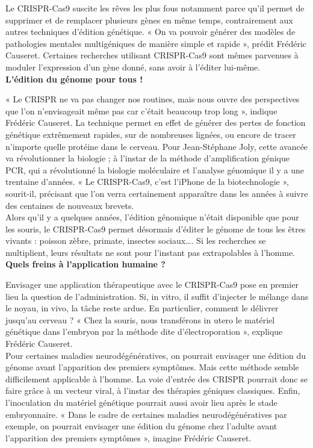 \documentclass[8pt]{article}
\begin{document}
Le CRISPR-Cas9 suscite les rêves les plus fous notamment parce qu’il permet de supprimer et de remplacer plusieurs gènes en même temps, contrairement aux autres techniques d’édition génétique. « On va pouvoir générer des modèles de pathologies mentales multigéniques de manière simple et rapide », prédit Frédéric Causeret. Certaines recherches utilisant CRISPR-Cas9 sont mêmes parvenues à moduler l’expression d’un gène donné, sans avoir à l’éditer lui-même.  \\

\textbf{L’édition du génome pour tous !}

« Le CRISPR ne va pas changer nos routines, mais nous ouvre des perspectives que l’on n’envisageait même pas car c’était beaucoup trop long », indique Frédéric Causeret. La technique permet en effet de générer des pertes de fonction génétique extrêmement rapides, sur de nombreuses lignées, ou encore de tracer n’importe quelle protéine dans le cerveau. Pour Jean-Stéphane Joly, cette avancée va révolutionner la biologie ; à l’instar de la méthode d’amplification génique PCR, qui a révolutionné la biologie moléculaire et l’analyse génomique il y a une trentaine d’années. « Le CRISPR-Cas9, c’est l’iPhone de la biotechnologie », sourit-il, précisant que l’on verra certainement apparaître dans les années à suivre des centaines de nouveaux brevets.  \\


Alors qu’il y a quelques années, l’édition génomique n’était disponible que pour les souris, le CRISPR-Cas9 permet désormais d’éditer le génome de tous les êtres vivants : poisson zèbre, primate, insectes sociaux…. Si les recherches se multiplient, leurs résultats ne sont pour l’instant pas extrapolables à l’homme.  \\

\textbf{Quels freins à l’application humaine ?}

Envisager une application thérapeutique avec le CRISPR-Cas9 pose en premier lieu la question de l’administration. Si, in vitro, il suffit d’injecter le mélange dans le noyau, in vivo, la tâche reste ardue. En particulier, comment le délivrer jusqu’au cerveau ? « Chez la souris, nous transférons in utero le matériel génétique dans l’embryon par la méthode dite d’électroporation », explique Frédéric Causeret.  \\

Pour certaines maladies neurodégénératives, on pourrait envisager une édition du génome avant l’apparition des premiers symptômes. Mais cette méthode semble difficilement applicable à l’homme. La voie d’entrée des CRISPR pourrait donc se faire grâce à un vecteur viral, à l’instar des thérapies géniques classiques. Enfin, l’inoculation du matériel génétique pourrait aussi avoir lieu après le stade embryonnaire. « Dans le cadre de certaines maladies neurodégénératives par exemple, on pourrait envisager une édition du génome chez l’adulte avant l’apparition des premiers symptômes », imagine Frédéric Causeret.  \\
\end{document}
